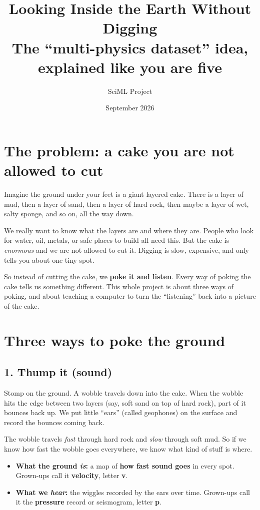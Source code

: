 \documentclass[11pt,a4paper]{article}
\title{\textbf{Looking Inside the Earth Without Digging}\\[4pt]
\large The ``multi-physics dataset'' idea, explained like you are five}
\author{SciML Project}
\date{September 2026}
\begin{document}
\maketitle

\section*{The problem: a cake you are not allowed to cut}

Imagine the ground under your feet is a giant layered cake.
There is a layer of mud, then a layer of sand, then a layer of hard rock,
then maybe a layer of wet, salty sponge, and so on, all the way down.

We really want to know what the layers are and where they are.
People who look for water, oil, metals, or safe places to build all need this.
But the cake is \emph{enormous} and we are not allowed to cut it.
Digging is slow, expensive, and only tells you about one tiny spot.

So instead of cutting the cake, we \textbf{poke it and listen}.
Every way of poking the cake tells us something different.
This whole project is about three ways of poking, and about teaching a computer
to turn the ``listening'' back into a picture of the cake.

\section*{Three ways to poke the ground}

\subsection*{1. \textcolor{seismic}{Thump it} (sound)}

Stomp on the ground. A wobble travels down into the cake.
When the wobble hits the edge between two layers (say, soft sand on top of hard rock),
part of it bounces back up. We put little ``ears'' (called geophones) on the surface
and record the bounces coming back.

The wobble travels \emph{fast} through hard rock and \emph{slow} through soft mud.
So if we know how fast the wobble goes everywhere, we know what kind of stuff is where.

\begin{itemize}[leftmargin=2em]
  \item \textbf{What the ground \emph{is}:} a map of \textbf{how fast sound goes} in every spot.
        Grown-ups call it \textbf{velocity}, letter \textbf{v}.
  \item \textbf{What we \emph{hear}:} the wiggles recorded by the ears over time.
        Grown-ups call it the \textbf{pressure} record or seismogram, letter \textbf{p}.
\end{itemize}
\end{document}
